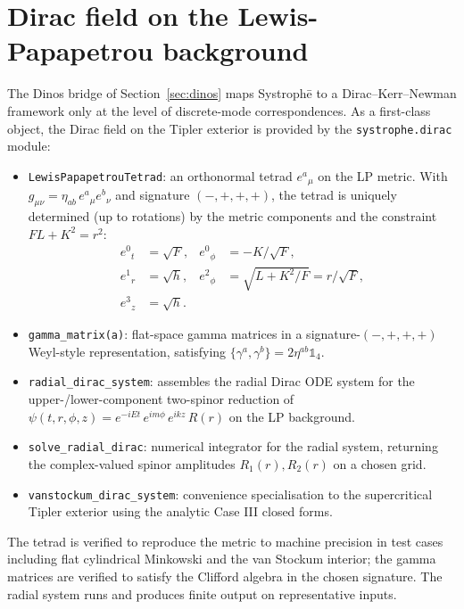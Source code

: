 \documentclass[11pt,a4paper]{article}
\begin{document}
\section{Dirac field on the Lewis-Papapetrou background}
\label{sec:dirac}

The Dinos bridge of Section~\ref{sec:dinos} maps Systroph\=e to a
Dirac--Kerr--Newman framework only at the level of discrete-mode
correspondences. As a first-class object, the Dirac field on the
Tipler exterior is provided by the \texttt{systrophe.dirac} module:

\begin{itemize}[leftmargin=*]
\item \texttt{LewisPapapetrouTetrad}: an orthonormal tetrad
  $e^a{}_\mu$ on the LP metric. With $g_{\mu\nu} = \eta_{ab}\,
  e^a{}_\mu e^b{}_\nu$ and signature $(-,+,+,+)$, the tetrad is
  uniquely determined (up to rotations) by the metric components and
  the constraint $FL + K^2 = r^2$:
  \begin{align}
  e^0{}_t &= \sqrt{F}, & e^0{}_\phi &= -K/\sqrt{F},\\
  e^1{}_r &= \sqrt{h}, & e^2{}_\phi &= \sqrt{L + K^2/F} = r/\sqrt{F},\\
  e^3{}_z &= \sqrt{h}.
  \end{align}
\item \texttt{gamma\_matrix(a)}: flat-space gamma matrices in a
  signature-$(-,+,+,+)$ Weyl-style representation, satisfying
  $\{\gamma^a, \gamma^b\} = 2 \eta^{ab} \mathbb{1}_4$.
\item \texttt{radial\_dirac\_system}: assembles the radial Dirac ODE
  system for the upper-/lower-component two-spinor reduction of
  $\psi(t, r, \phi, z) = e^{-i E t}\,e^{i m \phi}\,e^{i k z}\, R(r)$
  on the LP background.
\item \texttt{solve\_radial\_dirac}: numerical integrator for the
  radial system, returning the complex-valued spinor amplitudes
  $R_1(r), R_2(r)$ on a chosen grid.
\item \texttt{vanstockum\_dirac\_system}: convenience specialisation
  to the supercritical Tipler exterior using the analytic Case III
  closed forms.
\end{itemize}

The tetrad is verified to reproduce the metric to machine precision
in test cases including flat cylindrical Minkowski and the van
Stockum interior; the gamma matrices are verified to satisfy the
Clifford algebra in the chosen signature. The radial system runs and
produces finite output on representative inputs.
\end{document}
